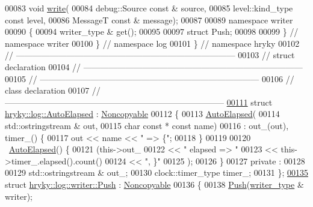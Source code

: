 \begin{DoxyCode}
00083     \textcolor{keywordtype}{void} \hyperlink{namespacehryky_1_1log_a5c7e76e7e42521f83c90fc8813f1f3ea}{write}(
00084         debug::Source \textcolor{keyword}{const} & source,
00085         level::kind\_type \textcolor{keyword}{const} level,
00086         MessageT \textcolor{keyword}{const} & message);
00087 
00089 \textcolor{keyword}{namespace }writer
00090 \{
00094     writer\_type & \textcolor{keyword}{get}();
00095 
00097     \textcolor{keyword}{struct }Push;
00098     
00099 \} \textcolor{comment}{// namespace writer}
00100 \} \textcolor{comment}{// namespace log}
00101 \} \textcolor{comment}{// namespace hryky}
00102 \textcolor{comment}{//
      ------------------------------------------------------------------------------}
00103 \textcolor{comment}{// struct declaration}
00104 \textcolor{comment}{//
      ------------------------------------------------------------------------------}
00105 \textcolor{comment}{//
      ------------------------------------------------------------------------------}
00106 \textcolor{comment}{// class declaration}
00107 \textcolor{comment}{//
      ------------------------------------------------------------------------------}
\hypertarget{log__writer__common_8h_source_l00111}{}\hyperlink{structhryky_1_1log_1_1_auto_elapsed}{00111} \textcolor{comment}{}\textcolor{keyword}{struct }\hyperlink{structhryky_1_1log_1_1_auto_elapsed}{hryky::log::AutoElapsed} : \hyperlink{classhryky_1_1_noncopyable}{Noncopyable}
00112 \{
00113     \hyperlink{structhryky_1_1log_1_1_auto_elapsed}{AutoElapsed}(
00114         std::ostringstream & out,
00115         \textcolor{keywordtype}{char} \textcolor{keyword}{const} * \textcolor{keyword}{const} name)
00116         : out\_(out), timer\_() \{
00117         out << name << \textcolor{stringliteral}{" => \{"};
00118     \}
00119 
00120     ~\hyperlink{structhryky_1_1log_1_1_auto_elapsed}{AutoElapsed}() \{
00121         (this->out\_
00122          << \textcolor{stringliteral}{" elapsed => "}
00123          << this->timer\_.elapsed().count() 
00124          << \textcolor{stringliteral}{", \}"}
00125          );
00126     \}
00127 \textcolor{keyword}{private} :
00128 
00129     std::ostringstream &    out\_;
00130     clock::timer\_type       timer\_;
00131 \};
\hypertarget{log__writer__common_8h_source_l00135}{}\hyperlink{structhryky_1_1log_1_1writer_1_1_push}{00135} \textcolor{keyword}{struct }\hyperlink{structhryky_1_1log_1_1writer_1_1_push}{hryky::log::writer::Push} : \hyperlink{classhryky_1_1_noncopyable}{Noncopyable}
00136 \{
00138     \hyperlink{structhryky_1_1log_1_1writer_1_1_push_adba8c36516d5f2d9fe6e53e6f8ede057}{Push}(\hyperlink{classhryky_1_1log_1_1writer_1_1_base}{writer_type} & writer);

\end{DoxyCode}

